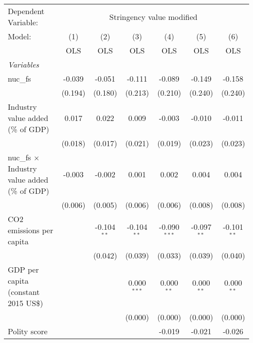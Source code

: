 
\begingroup
\centering
\begin{tabular}{lcccccc}
   \toprule
   Dependent Variable: & \multicolumn{6}{c}{Stringency value modified}\\
   Model:                                               & (1)     & (2)           & (3)           & (4)            & (5)           & (6)\\  
                                                        &  OLS    & OLS           & OLS           & OLS            & OLS           & OLS\\  
   \midrule
   \emph{Variables}\\
   nuc\_fs                                              & -0.039  & -0.051        & -0.111        & -0.089         & -0.149        & -0.158\\   
                                                        & (0.194) & (0.180)       & (0.213)       & (0.210)        & (0.240)       & (0.240)\\   
   Industry value added (\% of GDP)                     & 0.017   & 0.022         & 0.009         & -0.003         & -0.010        & -0.011\\   
                                                        & (0.018) & (0.017)       & (0.021)       & (0.019)        & (0.023)       & (0.023)\\   
   nuc\_fs $\times$ Industry value added (\% of GDP)    & -0.003  & -0.002        & 0.001         & 0.002          & 0.004         & 0.004\\   
                                                        & (0.006) & (0.005)       & (0.006)       & (0.006)        & (0.008)       & (0.008)\\   
   CO2 emissions per capita                             &         & -0.104$^{**}$ & -0.104$^{**}$ & -0.090$^{***}$ & -0.097$^{**}$ & -0.101$^{**}$\\   
                                                        &         & (0.042)       & (0.039)       & (0.033)        & (0.039)       & (0.040)\\   
   GDP per capita (constant 2015 US\$)                  &         &               & 0.000$^{***}$ & 0.000$^{**}$   & 0.000$^{**}$  & 0.000$^{**}$\\   
                                                        &         &               & (0.000)       & (0.000)        & (0.000)       & (0.000)\\   
   Polity score                                         &         &               &               & -0.019         & -0.021        & -0.026\\   

\end{tabular}
